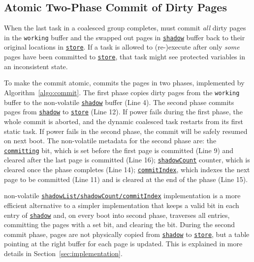 \subsection{Atomic Two-Phase Commit of Dirty Pages}

When the last task in a coalesced group completes, \sys must commit \emph{all} dirty pages in the \texttt{working} buffer and the swapped out pages in \texttt{\underline{shadow}} buffer back to their original locations in \texttt{\underline{store}}. If a task is allowed to (re-)execute after only \emph{some} pages have been committed to \texttt{\underline{store}}, that task might see protected variables in an inconsistent state.

To make the commit atomic, \sys commits the pages in two phases, implemented by Algorithm~\ref{algo:commit}.
%
The first phase copies dirty pages from the \texttt{working} buffer to the non-volatile \texttt{\underline{shadow}} buffer (Line 4). The second phase commits pages from \texttt{\underline{shadow}} to \texttt{\underline{store}} (Line 12).
If power fails during the first phase, the whole commit is aborted, and the dynamic coalesced task restarts from its first static task. If power fails in the second phase, the commit will be safely resumed on next boot.
The non-volatile metadata for the second phase are: the \texttt{\underline{committing}} bit, which is set before the first page is committed (Line 9) and cleared after the last page is committed (Line 16); \texttt{\underline{shadowCount}} counter, which is cleared once the phase completes (Line 14); \texttt{\underline{commitIndex}}, which indexes the next page to be committed (Line 11) and is cleared at the end of the phase (Line 15).

\sys non-volatile \texttt{\underline{shadowList/shadowCount/commitIndex}} implementation is a more efficient alternative to a simpler implementation that keeps a valid bit in each entry of \texttt{\underline{shadow}} and, on every boot into second phase, traverses all entries, committing the pages with a set bit, and clearing the bit. During the second commit phase, pages are not physically copied from \texttt{\underline{shadow}} to \texttt{\underline{store}}, but a table pointing at the right buffer for each page is updated. This is explained in more details in Section~\ref{sec:implementation}.

